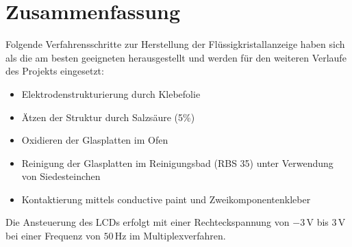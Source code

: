 \section{Zusammenfassung}

Folgende Verfahrensschritte zur Herstellung der Flüssigkristallanzeige haben sich als die am besten geeigneten herausgestellt und werden für den weiteren Verlaufe des Projekts eingesetzt:

\begin{itemize}
\item Elektrodenstrukturierung durch Klebefolie
\item Ätzen der Struktur durch Salzsäure (5\%)
\item Oxidieren der Glasplatten im Ofen
\item Reinigung der Glasplatten im Reinigungsbad (RBS 35) unter Verwendung von Siedesteinchen
\item Kontaktierung mittels conductive paint und Zweikomponentenkleber\\
\end{itemize}

Die Ansteuerung des LCDs erfolgt mit
einer Rechteckspannung von \(-3\,\textrm{V}\) bis \(3\,\textrm{V}\)
bei einer Frequenz von \(50\,\textrm{Hz}\) im
Multiplexverfahren.